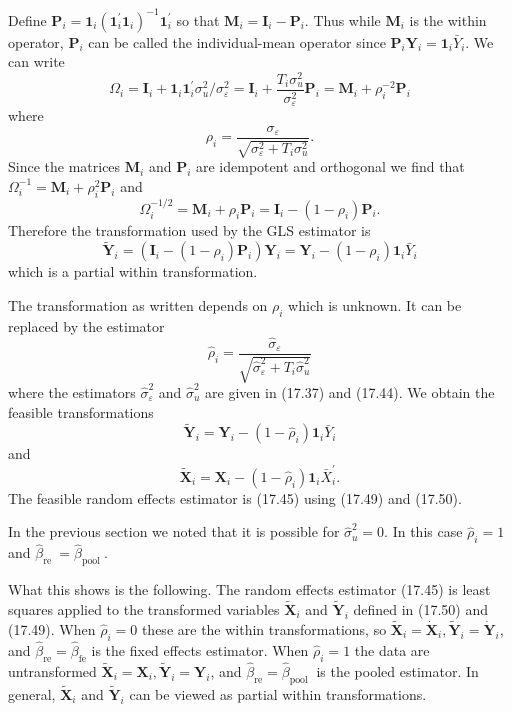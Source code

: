 \documentclass[10pt]{article}
\begin{document}
Define $\boldsymbol{P}_{i}=\mathbf{1}_{i}\left(\mathbf{1}_{i}^{\prime} \mathbf{1}_{i}\right)^{-1} \mathbf{1}_{i}^{\prime}$ so that $\boldsymbol{M}_{i}=\boldsymbol{I}_{i}-\boldsymbol{P}_{i}$. Thus while $\boldsymbol{M}_{i}$ is the within operator, $\boldsymbol{P}_{i}$ can be called the individual-mean operator since $\boldsymbol{P}_{i} \boldsymbol{Y}_{i}=\mathbf{1}_{i} \bar{Y}_{i}$. We can write
$$
\Omega_{i}=\boldsymbol{I}_{i}+\mathbf{1}_{i} \mathbf{1}_{i}^{\prime} \sigma_{u}^{2} / \sigma_{\varepsilon}^{2}=\boldsymbol{I}_{i}+\frac{T_{i} \sigma_{u}^{2}}{\sigma_{\varepsilon}^{2}} \boldsymbol{P}_{i}=\boldsymbol{M}_{i}+\rho_{i}^{-2} \boldsymbol{P}_{i}
$$
where
$$
\rho_{i}=\frac{\sigma_{\varepsilon}}{\sqrt{\sigma_{\varepsilon}^{2}+T_{i} \sigma_{u}^{2}}} .
$$
Since the matrices $\boldsymbol{M}_{i}$ and $\boldsymbol{P}_{i}$ are idempotent and orthogonal we find that $\Omega_{i}^{-1}=\boldsymbol{M}_{i}+\rho_{i}^{2} \boldsymbol{P}_{i}$ and
$$
\Omega_{i}^{-1 / 2}=\boldsymbol{M}_{i}+\rho_{i} \boldsymbol{P}_{i}=\boldsymbol{I}_{i}-\left(1-\rho_{i}\right) \boldsymbol{P}_{i} .
$$
Therefore the transformation used by the GLS estimator is
$$
\tilde{\boldsymbol{Y}}_{i}=\left(\boldsymbol{I}_{i}-\left(1-\rho_{i}\right) \boldsymbol{P}_{i}\right) \boldsymbol{Y}_{i}=\boldsymbol{Y}_{i}-\left(1-\rho_{i}\right) \mathbf{1}_{i} \bar{Y}_{i}
$$
which is a partial within transformation.

The transformation as written depends on $\rho_{i}$ which is unknown. It can be replaced by the estimator
$$
\widehat{\rho}_{i}=\frac{\widehat{\sigma}_{\varepsilon}}{\sqrt{\widehat{\sigma}_{\varepsilon}^{2}+T_{i} \widehat{\sigma}_{u}^{2}}}
$$
where the estimators $\widehat{\sigma}_{\varepsilon}^{2}$ and $\widehat{\sigma}_{u}^{2}$ are given in (17.37) and (17.44). We obtain the feasible transformations
$$
\widetilde{\boldsymbol{Y}}_{i}=\boldsymbol{Y}_{i}-\left(1-\widehat{\rho}_{i}\right) \mathbf{1}_{i} \bar{Y}_{i}
$$
and
$$
\widetilde{\boldsymbol{X}}_{i}=\boldsymbol{X}_{i}-\left(1-\widehat{\rho}_{i}\right) \mathbf{1}_{i} \bar{X}_{i}^{\prime} .
$$
The feasible random effects estimator is (17.45) using (17.49) and (17.50).

In the previous section we noted that it is possible for $\widehat{\sigma}_{u}^{2}=0$. In this case $\widehat{\rho}_{i}=1$ and $\widehat{\beta}_{\text {re }}=\widehat{\beta}_{\text {pool }}$.

What this shows is the following. The random effects estimator (17.45) is least squares applied to the transformed variables $\widetilde{\boldsymbol{X}}_{i}$ and $\widetilde{\boldsymbol{Y}}_{i}$ defined in (17.50) and (17.49). When $\widehat{\rho}_{i}=0$ these are the within transformations, so $\widetilde{\boldsymbol{X}}_{i}=\dot{\boldsymbol{X}}_{i}, \widetilde{\boldsymbol{Y}}_{i}=\dot{\boldsymbol{Y}}_{i}$, and $\widehat{\beta}_{\mathrm{re}}=\widehat{\beta}_{\mathrm{fe}}$ is the fixed effects estimator. When $\widehat{\rho}_{i}=1$ the data are untransformed $\widetilde{\boldsymbol{X}}_{i}=\boldsymbol{X}_{i}, \widetilde{\boldsymbol{Y}}_{i}=\boldsymbol{Y}_{i}$, and $\widehat{\beta}_{\mathrm{re}}=\widehat{\beta}_{\text {pool }}$ is the pooled estimator. In general, $\widetilde{\boldsymbol{X}}_{i}$ and $\widetilde{\boldsymbol{Y}}_{i}$ can be viewed as partial within transformations.
\end{document}
